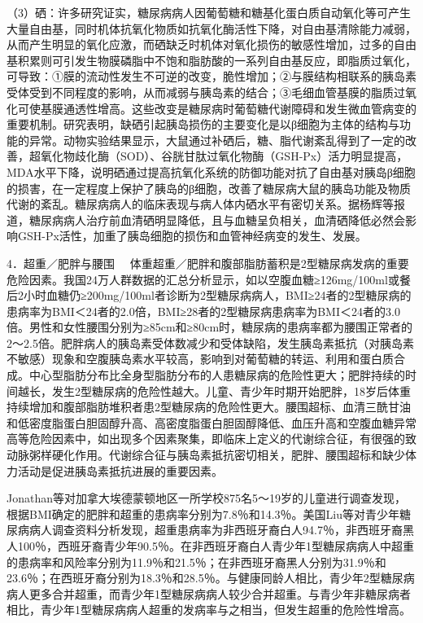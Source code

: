 （3）硒：许多研究证实，糖尿病病人因葡萄糖和糖基化蛋白质自动氧化等可产生大量自由基，同时机体抗氧化物质如抗氧化酶活性下降，对自由基清除能力减弱，从而产生明显的氧化应激，而硒缺乏时机体对氧化损伤的敏感性增加，过多的自由基积累则可引发生物膜磷脂中不饱和脂肪酸的一系列自由基反应，即脂质过氧化，可导致：①膜的流动性发生不可逆的改变，脆性增加；②与膜结构相联系的胰岛素受体受到不同程度的影响，从而减弱与胰岛素的结合；③毛细血管基膜的脂质过氧化可使基膜通透性增高。这些改变是糖尿病时葡萄糖代谢障碍和发生微血管病变的重要机制。研究表明，缺硒引起胰岛损伤的主要变化是以β细胞为主体的结构与功能的异常。动物实验结果显示，大鼠通过补硒后，糖、脂代谢紊乱得到了一定的改善，超氧化物歧化酶（SOD）、谷胱甘肽过氧化物酶（GSH-Px）活力明显提高，MDA水平下降，说明硒通过提高抗氧化系统的防御功能对抗了自由基对胰岛β细胞的损害，在一定程度上保护了胰岛的β细胞，改善了糖尿病大鼠的胰岛功能及物质代谢的紊乱。糖尿病病人的临床表现与病人体内硒水平有密切关系。据杨辉等报道，糖尿病病人治疗前血清硒明显降低，且与血糖呈负相关，血清硒降低必然会影响GSH-Px活性，加重了胰岛细胞的损伤和血管神经病变的发生、发展。

{4．超重／肥胖与腰围}
　体重超重／肥胖和腹部脂肪蓄积是2型糖尿病发病的重要危险因素。我国24万人群数据的汇总分析显示，如以空腹血糖≥126mg/100ml或餐后2小时血糖仍≥200mg/100ml者诊断为2型糖尿病病人，BMI≥24者的2型糖尿病的患病率为BMI＜24者的2.0倍，BMI≥28者的2型糖尿病患病率为BMI＜24者的3.0倍。男性和女性腰围分别为≥85cm和≥80cm时，糖尿病的患病率都为腰围正常者的2～2.5倍。肥胖病人的胰岛素受体数减少和受体缺陷，发生胰岛素抵抗（对胰岛素不敏感）现象和空腹胰岛素水平较高，影响到对葡萄糖的转运、利用和蛋白质合成。中心型脂肪分布比全身型脂肪分布的人患糖尿病的危险性更大；肥胖持续的时间越长，发生2型糖尿病的危险性越大。儿童、青少年时期开始肥胖，18岁后体重持续增加和腹部脂肪堆积者患2型糖尿病的危险性更大。腰围超标、血清三酰甘油和低密度脂蛋白胆固醇升高、高密度脂蛋白胆固醇降低、血压升高和空腹血糖异常高等危险因素中，如出现多个因素聚集，即临床上定义的代谢综合征，有很强的致动脉粥样硬化作用。代谢综合征与胰岛素抵抗密切相关，肥胖、腰围超标和缺少体力活动是促进胰岛素抵抗进展的重要因素。

Jonathan等对加拿大埃德蒙顿地区一所学校875名5～19岁的儿童进行调查发现，根据BMI确定的肥胖和超重的患病率分别为7.8％和14.3％。美国Liu等对青少年糖尿病病人调查资料分析发现，超重患病率为非西班牙裔白人94.7％，非西班牙裔黑人100％，西班牙裔青少年90.5％。在非西班牙裔白人青少年1型糖尿病病人中超重的患病率和风险率分别为11.9％和21.5％；在非西班牙裔黑人分别为31.9％和23.6％；在西班牙裔分别为18.3％和28.5％。与健康同龄人相比，青少年2型糖尿病病人更多合并超重，而青少年1型糖尿病病人较少合并超重。与青少年非糖尿病者相比，青少年1型糖尿病病人超重的发病率与之相当，但发生超重的危险性增高。

